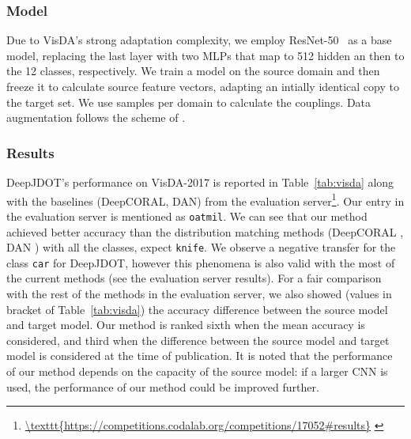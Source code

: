 \documentclass[runningheads]{llncs}
\begin{document}
\subsubsection*{Model} Due to VisDA's strong adaptation complexity, we employ ResNet-50~\cite{he2016deep} as a base model, replacing the last layer with two MLPs that map to 512 hidden an then to the 12 classes, respectively. We train a model on the source domain and then freeze it to calculate source feature vectors, adapting an intially identical copy to the target set. We use  samples per domain to calculate the couplings. Data augmentation follows the scheme of \cite{french2018}.

 
\subsubsection*{Results} DeepJDOT's performance on VisDA-2017 is reported in Table~\ref{tab:visda} along with the baselines (DeepCORAL, DAN) from the evaluation server{\footnote{\url{\texttt{https://competitions.codalab.org/competitions/17052\#results}} \label{ft:eval_url}}}. Our entry in the evaluation server is mentioned as \texttt{oatmil}. 
We can see that our method achieved better accuracy than the distribution matching methods (DeepCORAL \cite{deepcoral}, DAN \cite{long15}) with all the classes, expect \texttt{knife}. We observe a negative transfer for the class \texttt{car} for DeepJDOT, however this phenomena is also valid with the most of the current methods (see the evaluation server results).
For a fair comparison with the rest of the methods in the evaluation server, we also showed (values in bracket of Table~\ref{tab:visda}) the accuracy difference between the source model and target model. Our method is ranked sixth when the mean accuracy is considered, and third when the difference between the source model and target model is considered at the time of publication. It is noted that the performance of our method depends on the capacity of the source model: if a larger CNN is used, the performance of our method could be improved further.
\end{document}
